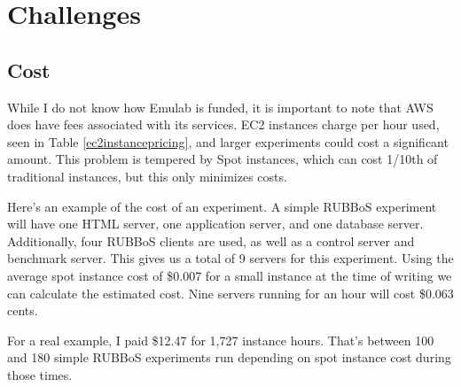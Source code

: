 \documentclass{article}
\begin{document}
\section{Challenges}
\subsection{Cost}
While I do not know how Emulab is funded, it is important to note that AWS does have fees associated with its services. EC2 instances charge per hour used, seen in Table \ref{ec2instancepricing}, and larger experiments could cost a significant amount. This problem is tempered by Spot instances, which can cost 1/10th of traditional instances, but this only minimizes costs.

Here's an example of the cost of an experiment. A simple RUBBoS experiment will have one HTML server, one application server, and one database server. Additionally, four RUBBoS clients are used, as well as a control server and benchmark server. This gives us a total of 9 servers for this experiment. Using the average spot instance cost of \$0.007 for a small instance at the time of writing we can calculate the estimated cost. Nine servers running for an hour will cost \$0.063 cents.

For a real example, I paid \$12.47 for 1,727 instance hours. That's between 100 and 180 simple RUBBoS experiments run depending on spot instance cost during those times.
\end{document}
